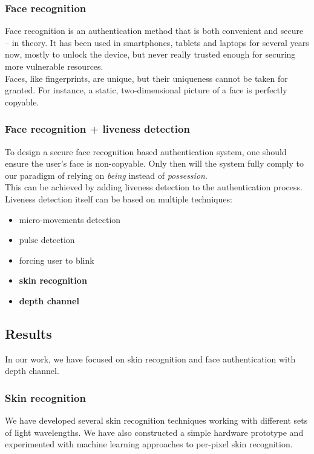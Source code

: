         \subsubsection*{Face recognition}
            Face recognition is an authentication method that is both convenient
            and secure -- in theory. It has been used in smartphones, tablets
            and laptops for several years now, mostly to unlock the device, but
            never really trusted enough for securing more vulnerable resources.\\
            Faces, like fingerprints, are unique, but their uniqueness cannot be
            taken for granted. For instance, a static, two-dimensional picture of
            a face is perfectly copyable.

        \subsubsection{Face recognition + liveness detection}
            To design a secure face recognition based authentication system,
            one should ensure the user's face is non-copyable. Only then will the
            system fully comply to our paradigm of relying on \textit{being} instead
            of \textit{possession}.\\
            This can be achieved by adding liveness detection to the authentication
            process. Liveness detection itself can be based on multiple techniques:
            \begin{itemize}
                \item micro-movements detection
                \item pulse detection
                \item forcing user to blink
                \item \textbf{skin recognition}
                \item \textbf{depth channel}
            \end{itemize}

    \subsection{Results}
        In our work, we have focused on skin recognition and face authentication
        with depth channel.
        \subsubsection*{Skin recognition}
        We have developed several skin recognition techniques working with different
        sets of light wavelengths. We have also constructed a simple hardware prototype
        and experimented with machine learning approaches to per-pixel skin recognition.

